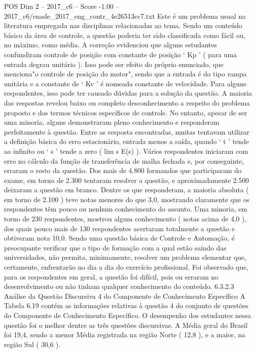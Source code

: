\begin{textsample}{POS Dim 2 – 2017\_c6 – Score -1.00 – 2017\_c6/enade\_2017\_eng\_contr\_4e26513cc7.txt}
Este é um problema usual na literatura empregada nas disciplinas relacionadas ao tema.
Sendo um conteúdo básico da área de controle, a questão poderia ter sido classificada como fácil ou, no máximo, como média.
A correção evidenciou que alguns estudantes confundiram controle de posição com constante de posição ‘ Kp ’ ( para uma entrada degrau unitário ).
Isso pode ser efeito do próprio enunciado, que menciona"o controle de posição do motor", sendo que a entrada é do tipo rampa unitária e a constante de ‘ Kv ’ é nomeada constante de velocidade.
Para alguns respondentes, isso pode ter causado dúvidas para a solução da questão.
A maioria das respostas revelou baixo ou completo desconhecimento a respeito do problema proposto e dos termos técnicos específicos de controle.
No entanto, apesar de ser uma minoria, alguns demonstraram pleno conhecimento e responderam perfeitamente à questão.
Entre as resposta encontradas, muitas tentavam utilizar a definição básica do erro estacionário, entrada menos a saída, quando ‘ t ’ tende ao infinito ou ‘ s ’ tende a zero ( lim s E(s) ).
Vários respondentes iniciaram com erro no cálculo da função de transferência de malha fechada e, por conseguinte, erraram o resto da questão.
Dos mais de 4.800 formandos que participaram do exame, em torno de 2.300 tentaram resolver a questão, e aproximadamente 2.500 deixaram a questão em branco.
Dentre os que responderam, a maioria absoluta ( em torno de 2.100 ) teve notas menores do que 3,0, mostrando claramente que os respondentes têm pouco ou nenhum conhecimento do assunto.
Uma minoria, em torno de 230 respondentes, mostrou algum conhecimento ( notas acima de 4,0 ), dos quais pouco mais de 130 respondentes acertaram totalmente a questão e obtiveram nota 10,0.
Sendo uma questão básica de Controle e Automação, é preocupante verificar que o tipo de formação com a qual estão saindo das universidades, não permita, minimamente, resolver um problema elementar que, certamente, enfrentarão no dia a dia do exercício profissional.
Foi observado que, para os respondentes em geral, a questão foi difícil, pois ou erraram no desenvolvimento ou não tinham qualquer conhecimento do conteúdo. 6.3.2.3 Análise da Questão Discursiva 4 do Componente de Conhecimento Específico A Tabela 6.19 contém as informações relativas à questão 4 do conjunto de questões do Componente de Conhecimento Específico.
O desempenho dos estudantes nessa questão foi o melhor dentre as três questões discursivas.
A Média geral do Brasil foi 19,4, sendo a menor Média registrada na região Norte ( 12,8 ), e a maior, na região Sul ( 30,6 ).

\end{textsample}
